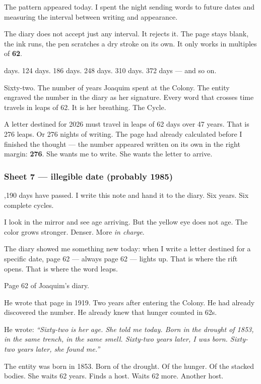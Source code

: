 \noindent The pattern appeared today. I spent the night sending words to future dates and measuring the interval between writing and appearance.

\noindent The diary does not accept just any interval. It rejects it. The page stays blank, the ink runs, the pen scratches a dry stroke on its own. It only works in multiples of \textbf{62}.

 days. 124 days. 186 days. 248 days. 310 days. 372 days --- and so on.

\noindent Sixty-two. The number of years Joaquim spent at the Colony. The entity engraved the number in the diary as her signature. Every word that crosses time travels in leaps of 62. It is her breathing. The Cycle.

\noindent A letter destined for 2026 must travel in leaps of 62 days over 47 years. That is 276 leaps. Or 276 nights of writing. The page had already calculated before I finished the thought --- the number appeared written on its own in the right margin: \textbf{276}. She wants me to write. She wants the letter to arrive.

\subsubsection*{Sheet 7 --- illegible date (probably 1985)}

,190 days have passed. I write this note and hand it to the diary. Six years. Six complete cycles.

\noindent I look in the mirror and see age arriving. But the yellow eye does not age. The color grows stronger. Denser. More \textit{in charge}.

\noindent The diary showed me something new today: when I write a letter destined for a specific date, page 62 --- always page 62 --- lights up. That is where the rift opens. That is where the word leaps.

\noindent Page 62 of Joaquim's diary.

\noindent He wrote that page in 1919. Two years after entering the Colony. He had already discovered the number. He already knew that hunger counted in 62s.

\noindent He wrote: \textit{\textquotedblleft{}Sixty-two is her age. She told me today. Born in the drought of 1853, in the same trench, in the same smell. Sixty-two years later, I was born. Sixty-two years later, she found me.\textquotedblright{}}

\noindent The entity was born in 1853. Born of the drought. Of the hunger. Of the stacked bodies. She waits 62 years. Finds a host. Waits 62 more. Another host.

